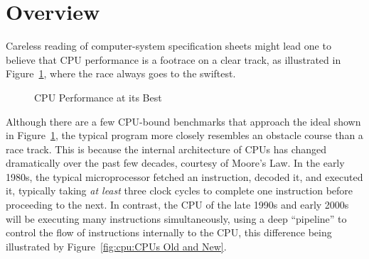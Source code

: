 
\section{Overview}
\label{sec:cpu:Overview}

Careless reading of computer-system specification sheets might lead one
to believe that CPU performance is a footrace on a clear track, as
illustrated in Figure~\ref{fig:cpu:CPU Performance at its Best},
where the race always goes to the swiftest.

\begin{figure}[htb]
\begin{center}
\end{center}
\caption{CPU Performance at its Best}
\label{fig:cpu:CPU Performance at its Best}
\end{figure}

Although there are a few CPU-bound benchmarks that approach the ideal
shown in Figure~\ref{fig:cpu:CPU Performance at its Best},
the typical program more closely resembles an obstacle course than
a race track.
This is because the internal architecture of CPUs has changed dramatically
over the past few decades, courtesy of Moore's Law.
In the early 1980s, the typical microprocessor fetched an instruction,
decoded it, and executed it, typically taking \emph{at least} three
clock cycles to complete one instruction before proceeding to the next.
In contrast, the CPU of the late 1990s and early 2000s will be executing
many instructions simultaneously, using a deep ``pipeline'' to control
the flow of instructions internally to the CPU, this difference being
illustrated by Figure~\ref{fig:cpu:CPUs Old and New}.

